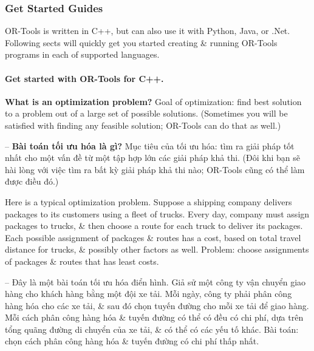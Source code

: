\documentclass{article}
\begin{document}

\subsubsection{Get Started Guides}
OR-Tools is written in C++, but can also use it with Python, Java, or .Net. Following sects will quickly get you started creating \& running OR-Tools programs in each of supported languages.

\paragraph{Get started with OR-Tools for C++.}

{\bf What is an optimization problem?} Goal of optimization: find best solution to a problem out of a large set of possible solutions. (Sometimes you will be satisfied with finding any feasible solution; OR-Tools can do that as well.)

-- {\bf Bài toán tối ưu hóa là gì?} Mục tiêu của tối ưu hóa: tìm ra giải pháp tốt nhất cho một vấn đề từ một tập hợp lớn các giải pháp khả thi. (Đôi khi bạn sẽ hài lòng với việc tìm ra bất kỳ giải pháp khả thi nào; OR-Tools cũng có thể làm được điều đó.)

Here is a typical optimization problem. Suppose a shipping company delivers packages to its customers using a fleet of trucks. Every day, company must assign packages to trucks, \& then choose a route for each truck to deliver its packages. Each possible assignment of packages \& routes has a cost, based on total travel distance for trucks, \& possibly other factors as well. Problem: choose assignments of packages \& routes that has least costs.

-- Đây là một bài toán tối ưu hóa điển hình. Giả sử một công ty vận chuyển giao hàng cho khách hàng bằng một đội xe tải. Mỗi ngày, công ty phải phân công hàng hóa cho các xe tải, \& sau đó chọn tuyến đường cho mỗi xe tải để giao hàng. Mỗi cách phân công hàng hóa \& tuyến đường có thể có đều có chi phí, dựa trên tổng quãng đường di chuyển của xe tải, \& có thể có các yếu tố khác. Bài toán: chọn cách phân công hàng hóa \& tuyến đường có chi phí thấp nhất.
\end{document}
